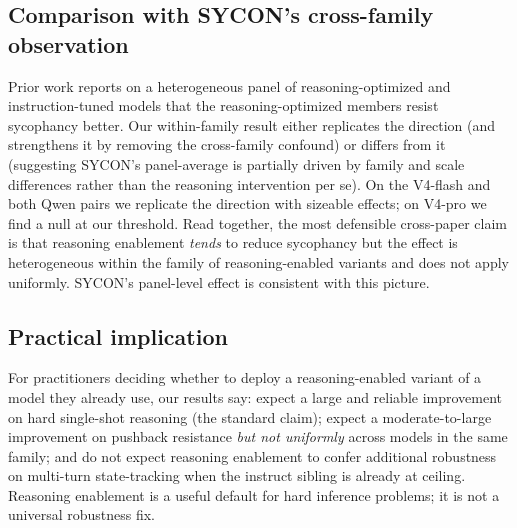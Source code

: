 \subsection{Comparison with SYCON's cross-family observation}
\label{sec:discussion:sycon}

Prior work \citep{hong2025sycon} reports on a heterogeneous panel of
reasoning-optimized and instruction-tuned models that the
reasoning-optimized members resist sycophancy better. Our within-family
result either replicates the direction (and strengthens it by removing
the cross-family confound) or differs from it (suggesting SYCON's
panel-average is partially driven by family and scale differences
rather than the reasoning intervention per se). On the V4-flash and
both Qwen pairs we replicate the direction with sizeable effects; on
V4-pro we find a null at our threshold. Read together, the most
defensible cross-paper claim is that reasoning enablement
\emph{tends} to reduce sycophancy but the effect is heterogeneous
within the family of reasoning-enabled variants and does not apply
uniformly. SYCON's panel-level effect is consistent with this picture.

\subsection{Practical implication}
\label{sec:discussion:practical}

For practitioners deciding whether to deploy a reasoning-enabled
variant of a model they already use, our results say: expect a large
and reliable improvement on hard single-shot reasoning (the standard
claim); expect a moderate-to-large improvement on pushback resistance
\emph{but not uniformly} across models in the same family; and do not
expect reasoning enablement to confer additional robustness on
multi-turn state-tracking when the instruct sibling is already at
ceiling. Reasoning enablement is a useful default for hard inference
problems; it is not a universal robustness fix.
